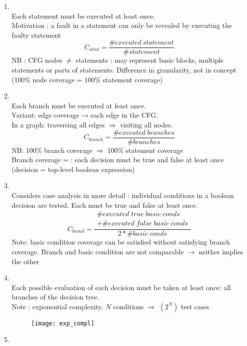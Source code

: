 \begin{enumerate}
    \item {}\\
    Each statement must be executed at least once.\\
    Motivation : a fault in a statement can only be revealed by executing the faulty statement 
    $$C_{stmt} = \frac{\#executed\ statement}{\#statement}$$
    NB : CFG nodes $\neq$ statements : may represent basic blocks, multiple statements or parts of statements. Difference in granularity, not in concept (100\% node coverage = 100\% statement coverage)
    \item {}\\
    Each branch must be executed at least once.\\
    Variant: edge coverage → each edge in the CFG.\\
    In a graph: traversing all edges $\Rightarrow$ visiting all nodes.
    $$C_{branch} = \frac{\#executed\;branches}{\#branches}$$
    NB: 100\% branch coverage $\Rightarrow$ 100\% statement coverage\\
    Branch coverage =  : each decision must be true and false at least once (decision = top-level boolean expression)
    \item {}\\ 
    Considers case analysis in more detail : individual conditions in a boolean decision are tested. Each  must be true and false at least once.
$$C_{bcond} = \frac{
\begin{gathered}
\#executed\;true\;basic\;conds\\
+\#executed\;false\;basic\;conds
\end{gathered}
}{2*\#basic\;conds}$$
    Note: basic condition coverage can be satisfied without satisfying branch coverage. Branch and basic condition are not comparable $\rightarrow$ neither implies the other
    \item {}\\ 
    Each possible evaluation of each decision must be taken at least once: all branches of the decision tree.\\
    Note : exponential complexity. $N$ conditions $\Rightarrow$ \bigO$(2^N)$ test cases
    \begin{figure}[H]
        \centering
        \texttt{[image: exp\_compl]}
    \end{figure}
    \item {}
    

\end{enumerate}
